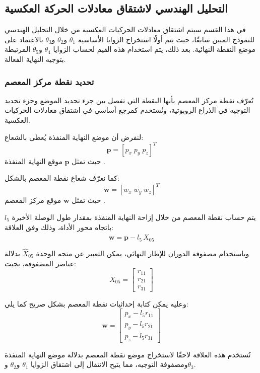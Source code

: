 \subsection{التحليل الهندسي لاشتقاق معادلات الحركة العكسية}
في هذا القسم سيتم اشتقاق معادلات الحركيات العكسية من خلال التحليل الهندسي للنموذج المبين سابقًا، حيث يتم أولًا استخراج الزوايا الأساسية $\theta_1$ و$\theta_2$ و$\theta_3$ بالاعتماد على موضع النقطة النهائية. بعد ذلك، يتم استخدام هذه القيم لحساب الزوايا $\theta_4$ و$\theta_5$ المرتبطة بتوجيه النهاية الفعالة.




\subsubsection{تحديد نقطة مركز المعصم}

تُعرّف نقطة مركز المعصم  بأنها النقطة التي تفصل بين جزء تحديد الموضع  وجزء تحديد التوجيه  في الذراع الروبوتية، وتُستخدم كمرجع أساسي في اشتقاق معادلات الحركيات العكسية.

لنفرض أن موضع النهاية المنفذة يُعطى بالشعاع:
\[
\mathbf{p} = [p_x \; p_y \; p_z]^T
\]
حيث تمثل $\mathbf{p}$ موقع النهاية المنفذة .

كما نعرّف شعاع نقطة المعصم بالشكل:
\[
\mathbf{w} = [w_x \; w_y \; w_z]^T
\]
حيث تمثل $\mathbf{w}$ موقع مركز المعصم .

يتم حساب نقطة المعصم من خلال إزاحة النهاية المنفذة بمقدار طول الوصلة الأخيرة $l_5$ باتجاه محور الأداة، وذلك وفق العلاقة:
\[
\mathbf{w} = \mathbf{p} - l_5 \, \hat{X}_{05}
\]

وباستخدام مصفوفة الدوران للإطار النهائي، يمكن التعبير عن متجه الوحدة $\hat{X}_{05}$ بدلالة عناصر المصفوفة، بحيث:
\[
\hat{X}_{05} =
\begin{bmatrix}
r_{11} \\
r_{21} \\
r_{31}
\end{bmatrix}
\]

وعليه يمكن كتابة إحداثيات نقطة المعصم بشكل صريح كما يلي:
\[
\mathbf{w} =
\begin{bmatrix}
p_x - l_5 r_{11} \\
p_y - l_5 r_{21} \\
p_z - l_5 r_{31}
\end{bmatrix}
\]

تُستخدم هذه العلاقة لاحقًا لاستخراج موضع نقطة المعصم بدلالة موضع النهاية المنفذة ومصفوفة التوجيه، مما يتيح الانتقال إلى اشتقاق الزوايا $\theta_1$ و$\theta_2$ و$\theta_3$.




